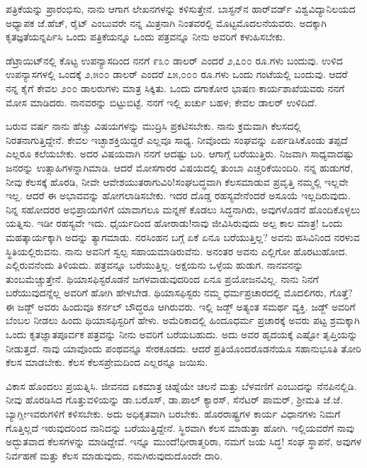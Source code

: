 ಪತ್ರಿಕೆಯನ್ನು ಪ್ರಾರಂಭಿಸು, ನಾನು ಆಗಾಗ ಲೇಖನಗಳನ್ನು ಕಳಿಸುತ್ತೇನೆ. ಬಾಸ್ಟನ್‌ನ ಹಾರ್‌ವರ್ಡ್ ವಿಶ್ವವಿದ್ಯಾನಿಲಯದ ಅಧ್ಯಾಪಕ ಜೆ.ಹೆಚ್, ರೈಟ್ ಎಂಬುವರೇ ನನ್ನ ಮಿತ್ರನಾಗಿ ನಿಂತವರಲ್ಲಿ ಮೊಟ್ಟಮೊದಲನೆಯವರು. ಅದಕ್ಕಾಗಿ ಕೃತಜ್ಞತೆಯನ್ನರ್ಪಿಸಿ ಒಂದು ಪತ್ರಿಕೆಯನ್ನೂ ಒಂದು ಪತ್ರವನ್ನೂ ನೀನು ಅವರಿಗೆ ಕಳುಹಿಸಬೇಕು.

ಡೆಟ್ರಾಯಿಟ್‌ನಲ್ಲಿ ಕೊಟ್ಟ ಉಪನ್ಯಾಸದಿಂದ ನನಗೆ ೯೩೦ ಡಾಲರ್ ಎಂದರೆ ೨,೭೦೦ ರೂ.ಗಳು ಬಂದುವು. ಉಳಿದ ಉಪನ್ಯಾಸಗಳಲ್ಲಿ ಒಂದಕ್ಕೆ ೨,೫೦೦ ಡಾಲರ್ ಎಂದರೆ ೭೫,೦೦೦ ರೂ.ಗಳು ಒಂದು ಗಂಟೆಯಲ್ಲಿ ಬಂದುವು. ಆದರೆ ನನ್ನ ಕೈಗೆ ಕೇವಲ ೨೦೦ ಡಾಲರುಗಳು ಮಾತ್ರ ಸಿಕ್ಕಿತು. ಒಂದು ದಗಾಕೋರ ಭಾಷಣ ಕಾರ್ಯಶಾಖೆಯವರು ನನಗೆ ಮೋಸ ಮಾಡಿದರು. ನಾನವರನ್ನು ಬಿಟ್ಟುಬಿಟ್ಟೆ. ನನಗೆ ಇಲ್ಲಿ ಖರ್ಚು ಬಹಳ; ಕೇವಲ  ಡಾಲರ್‌ ಉಳಿದಿದೆ.

ಬರುವ ವರ್ಷ ನಾನು ಹೆಚ್ಚು ವಿಷಯಗಳನ್ನು ಮುದ್ರಿಸಿ ಪ್ರಕಟಿಸಬೇಕು. ನಾನು ಕ್ರಮವಾಗಿ ಕೆಲಸದಲ್ಲಿ ನಿರತನಾಗುತ್ತಿದ್ದೇನೆ. ಕೇವಲ ಇಚ್ಛಾಶಕ್ತಿಯಿದ್ದರೆ ಎಲ್ಲವೂ ಸಾಧ್ಯ. ನೀವೊಂದು ಸಂಘವನ್ನು ಏರ್ಪಡಿಸಿಕೊಂಡು ತಪ್ಪದೆ ಎಲ್ಲರೂ ಕಲೆಯಬೇಕು. ಅದರ ವಿಷಯವಾಗಿ ನನಗೆ ಆದಷ್ಟು ಬರಿ. ಆಗಾಗ್ಗೆ ಬರೆಯುತ್ತಿರು. ನಿಜವಾಗಿ ಸಾಧ್ಯವಾದಷ್ಟು ಜನರನ್ನು ಉತ್ಸಾಹಿಗಳನ್ನಾಗಿಮಾಡಿ. ಆದರೆ ಮೋಸಗಾರರ ವಿಷಯದಲ್ಲಿ ತುಂಬಾ ಎಚ್ಚರಿಕೆಯಿಂದಿರಿ. ನನ್ನ ಹುಡುಗರೆ, ನೀವು ಕೆಲಸಕ್ಕೆ ಹೊರಡಿ, ನೀವೇ ಆವೇಶಯುತರಾಗುವಿರಿ!ಸಂಘಬದ್ಧವಾಗಿ ಕೆಲಸಮಾಡುವ ಪ್ರವೃತ್ತಿ ನಮ್ಮಲ್ಲಿ ಇಲ್ಲವೇ ಇಲ್ಲ. ಆದರೆ ಈ ಅಭಾವವನ್ನು ಹೋಗಲಾಡಿಸಬೇಕು. ಇದರ ದೊಡ್ಡ ರಹಸ್ಯವೇನೆಂದರೆ ಅಸೂಯೆ ಇಲ್ಲದಿರುವುದು. ನಿನ್ನ ಸಹೋದರರ ಅಭಿಪ್ರಾಯಗಳಿಗೆ ಯಾವಾಗಲೂ ಮನ್ನಣೆ ಕೊಡಲು ಸಿದ್ಧನಾಗಿರು, ಅವುಗಳೊಡನೆ ಹೊಂದಿಕೊಳ್ಳಲು ಯತ್ನಿಸು. ಇಡೀ ರಹಸ್ಯವೇ ಇದು. ಧೈರ್ಯದಿಂದ ಹೋರಾಡು!ನಾವು ಜೀವಿಸಿರುವುದು ಅಲ್ಪ ಕಾಲ ಮಾತ್ರ! ಒಂದು ಮಹತ್ಕಾರ್ಯಕ್ಕಾಗಿ ಅದನ್ನು ತ್ಯಾಗಮಾಡು. ನರಸಿಂಹನ ಬಗ್ಗೆ ಏಕೆ ಏನೂ ಬರೆಯುತ್ತಿಲ್ಲ? ಅವನು ಹಸಿವಿನಿಂದ ನರಳುವ ಸ್ಥಿತಿಯಲ್ಲಿರುವನು. ನಾನು ಅವನಿಗೆ ಸ್ವಲ್ಪ ಸಹಾಯಮಾಡಿರುವೆನು. ಅನಂತರ ಅವನು ಎಲ್ಲಿಗೋ ಹೊರಟುಹೋದ. ಎಲ್ಲಿರುವನೆಂದು ತಿಳಿಯದು. ಪತ್ರವನ್ನೂ ಬರೆಯುತ್ತಿಲ್ಲ. ಅಕ್ಷಯನು ಒಳ್ಳೆಯ ಹುಡುಗ. ನಾನವನನ್ನು ತುಂಬಮೆಚ್ಚುತ್ತೇನೆ. ಥಿಯಾಸಫಿಸ್ಟರೊಡನೆ ಜಗಳವಾಡುವುದರಿಂದ ಏನೂ ಪ್ರಯೋಜನವಿಲ್ಲ. ನಾನು ನಿನಗೆ ಬರೆಯುವುದನ್ನೆಲ್ಲ ಅವರಿಗೆ ಹೋಗಿ ಹೇಳಬೇಡ. ಥಿಯಾಸಫಿಸ್ಟರು ನಮ್ಮ ಧರ್ಮಪ್ರಚಾರದಲ್ಲಿ ಮೊದಲಿಗರು, ಗೊತ್ತೆ? ಈ ಜಡ್ಜ್ ಅವರು ಹಿಂದುವೂ ಕರ್ನಲ್ ಬೌದ್ಧರೂ ಆಗಿರುವರು. ಇಲ್ಲಿ ಜಡ್ಜ್ ಅತ್ಯಂತ ಸಮರ್ಥ ವ್ಯಕ್ತಿ. ಜಡ್ಜ್ ಅವರಿಗೆ ಬೆಂಬಲ ನೀಡಲು ಹಿಂದು ಥಿಯಾಸಫಿಸ್ಟರಿಗೆ ಹೇಳು. ಅಮೆರಿಕಾದಲ್ಲಿ ಹಿಂದೂಧರ್ಮ ಪ್ರಚಾರಕ್ಕೆ ಅವರು ಪಟ್ಟ ಶ್ರಮಕ್ಕಾಗಿ ಒಂದು ಕೃತಜ್ಞಾತಪೂರ್ವಕ ಪತ್ರವನ್ನು ನೀನು ಅವರಿಗೆ ಬರೆಯಬಹುದು. ಅದು ಅವರ ಹೃದಯಕ್ಕೆ ಎಷ್ಟೋ ತೃಪ್ತಿಯನ್ನು ನೀಡುತ್ತದೆ. ನಾವು ಯಾವೊಂದು ಪಂಥವನ್ನೂ ಸೇರಕೂಡದು. ಆದರೆ ಪ್ರತಿಯೊಂದರೊಡನೆಯೂ ಸಹಾನುಭೂತಿ ತೋರಿ ಕೆಲಸ ಮಾಡಬೇಕು. ಕೆಲಸ ಕೆಲಸ\enginline{-}ಪ್ರೇಮದಿಂದ ಎಲ್ಲರನ್ನೂ ಜಯಿಸು.

ವಿಕಾಸ ಹೊಂದಲು ಪ್ರಯತ್ನಿಸಿ. ಜೀವನದ ಏಕಮಾತ್ರ ಚಿಹ್ನೆಯೇ ಚಲನೆ ಮತ್ತು ಬೆಳ\break ವಣಿಗೆ ಎಂಬುದನ್ನು ನೆನಪಿನಲ್ಲಿಡಿ. ನೀವು ಹೊರಡಿಸಿದ ಗೊತ್ತುವಳಿಯನ್ನು ಡಾ.ಬರೊಸ್, ಡಾ.ಪಾಲ್ ಕ್ಯಾರಸ್, ಸೆನೆಟರ್ ಪಾಮರ್, ಶ‍್ರೀಮತಿ ಜೆ.ಜೆ. ಬ್ಯಾಗ್ಲೀ\enginline{-}ಇವರುಗಳಿಗೆ ಕಳಿಸಬೇಕು. ಅದು ಅಧಿಕೃತವಾಗಿ ಬರಬೇಕು. ಹೊರರಾಷ್ಟ್ರಗಳ ಕಾರ್ಯ ವಿಧಾನಗಳು ನಿಮಗೆ ಗೊತ್ತಿಲ್ಲದೆ ಇರುವುದರಿಂದ ನಾನಿದನ್ನು ಬರೆಯುತ್ತಿದ್ದೇನೆ. ಸ್ಥಿರವಾಗಿ ಕೆಲಸ ಮಾಡುತ್ತಾ ಹೋಗಿ. ಇಲ್ಲಿಯವರೆಗೆ ನಾವು ಅದ್ಭುತವಾದ ಕೆಲಸಗಳನ್ನು ಮಾಡಿದ್ದೇವೆ. ಇನ್ನೂ ಮುಂದೆ!ಧೀರಾತ್ಮರಿರಾ, ನಮಗೆ ಜಯ ಸಿದ್ಧ! ಸಂಘ ಸ್ಥಾಪನೆ, ಅವುಗಳ ನಿರ್ವಹಣೆ ಮತ್ತು ಕೆಲಸ ಮಾಡುವುದು, ನಮಗಿರುವುದುದೊಂದೇ ದಾರಿ.

